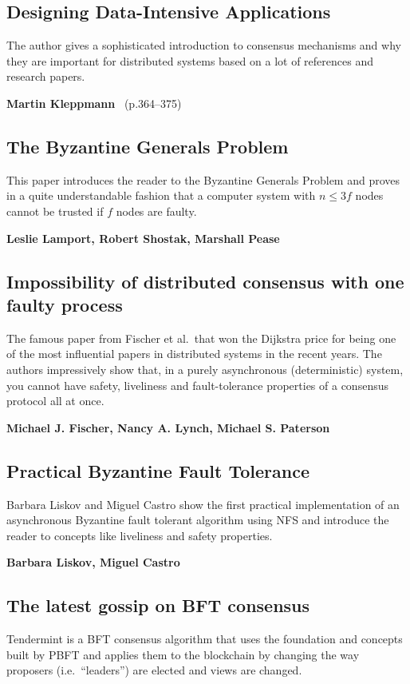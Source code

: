 \subsection{Designing Data-Intensive Applications}
The author gives a sophisticated introduction to consensus mechanisms and why they are important for distributed systems based on a lot of references and research papers.

\textbf{Martin Kleppmann}~\cite{kleppmann17desig} (p.364--375)

\subsection{The Byzantine Generals Problem}
This paper introduces the reader to the Byzantine Generals Problem and proves in a quite understandable fashion that a computer system with $n \leq 3f$ nodes cannot be trusted if $f$ nodes are faulty.

\textbf{Leslie Lamport, Robert Shostak, Marshall Pease}~\cite{lamport2002}

\subsection{Impossibility of distributed consensus with one faulty process}
The famous paper from Fischer et al.\ that won the Dijkstra price for being one of the most influential papers in distributed systems in the recent years. The authors impressively show that, in a purely asynchronous (deterministic) system, you cannot have safety, liveliness and fault-tolerance properties of a consensus protocol all at once.

\textbf{Michael J. Fischer, Nancy A. Lynch, Michael S. Paterson}~\cite{impossibility_result_1985}

\subsection{Practical Byzantine Fault Tolerance}
Barbara Liskov and Miguel Castro show the first practical implementation of an asynchronous Byzantine fault tolerant algorithm using NFS and introduce the reader to concepts like liveliness and safety properties.

\textbf{Barbara Liskov, Miguel Castro}~\cite{liskov1999}

\subsection{The latest gossip on BFT consensus}
Tendermint is a BFT consensus algorithm that uses the foundation and concepts built by PBFT and applies them to the blockchain by changing the way proposers (i.e.\ ``leaders'') are elected and views are changed.

